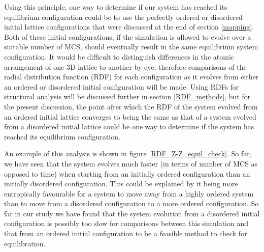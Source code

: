 Using this principle, one way to determine if our system has reached its equilibrium configuration could be to use the perfectly ordered or disordered initial lattice configurations that were discussed at the end of section \ref{mapping}. Both of these initial configurations, if the simulation is allowed to evolve over a suitable number of MCS, should eventually result in the same equilibrium system configuration. It would be difficult to distinguish differences in the atomic arrangement of one 3D lattice to another by eye, therefore comparisons of the radial distribution function (RDF) for each configuration as it evolves from either an ordered or disordered initial configuration will be made. Using RDFs for structural analysis will be discussed further in section \ref{RDF_methods}, but for the present discussion, the point after which the RDF of the system evolved from an ordered initial lattice converges to being the same as that of a system evolved from a disordered initial lattice could be one way to determine if the system has reached its equilibrium configuration. 

An example of this analysis is shown in figure \ref{RDF_Z-Z_equil_check}. So far, we have seen that the system evolves much faster (in terms of number of MCS as opposed to time) when starting from an initially ordered configuration than an initially disordered configuration. This could be explained by it being more entropically favourable for a system to move away from a highly ordered system than to move from a disordered configuration to a more ordered configuration. 
So far in our study we have found that the system evolution from a disordered initial configuration is possibly too slow for comparisons between this simulation and that from an ordered initial configuration to be a feasible method to check for equilibration.


